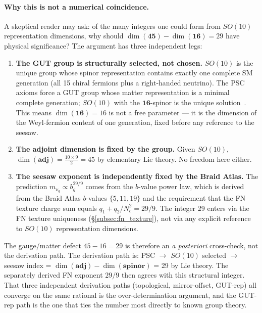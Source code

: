\documentclass[12pt,a4paper]{article}
\theoremstyle{definition}
\theoremstyle{remark}
\begin{document}
\paragraph{Why this is not a numerical coincidence.}
A skeptical reader may ask: of the many integers one could form from $SO(10)$ representation dimensions, why should $\dim(\mathbf{45}) - \dim(\mathbf{16}) = 29$ have physical significance? The argument has three independent legs:
\begin{enumerate}[nosep,leftmargin=1.5em]
  \item \textbf{The GUT group is structurally selected, not chosen.} $SO(10)$ is the unique group whose spinor representation contains exactly one complete SM generation (all 15 chiral fermions plus a right-handed neutrino). The PSC axioms force a GUT group whose matter representation is a minimal complete generation; $SO(10)$ with the $\mathbf{16}$-spinor is the unique solution~\cite{SpivackNEMS05}. This means $\dim(\mathbf{16}) = 16$ is not a free parameter — it is the dimension of the Weyl-fermion content of one generation, fixed before any reference to the seesaw.

  \item \textbf{The adjoint dimension is fixed by the group.} Given $SO(10)$, $\dim(\mathbf{adj}) = \frac{10 \times 9}{2} = 45$ by elementary Lie theory. No freedom here either.

  \item \textbf{The seesaw exponent is independently fixed by the Braid Atlas.} The prediction $m_{\nu_g} \propto b_g^{29/9}$ comes from the $b$-value power law, which is derived from the Braid Atlas $b$-values $\{5,11,19\}$ and the requirement that the FN texture charge sum equals $q_1 + q_2/N_c^2 = 29/9$. The integer 29 enters via the FN texture uniqueness (\S\ref{subsec:fn_texture}), not via any explicit reference to $SO(10)$ representation dimensions.
\end{enumerate}
The gauge/matter defect $45 - 16 = 29$ is therefore an \emph{a posteriori} cross-check, not the derivation path. The derivation path is: PSC $\to$ $SO(10)$ selected $\to$ seesaw index = $\dim(\mathbf{adj}) - \dim(\mathbf{spinor})$ = 29 by Lie theory. The separately derived FN exponent $29/9$ then agrees with this structural integer. That three independent derivation paths (topological, mirror-offset, GUT-rep) all converge on the same rational is the over-determination argument, and the GUT-rep path is the one that ties the number most directly to known group theory.
\end{document}
